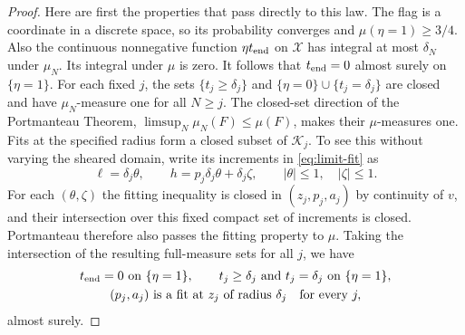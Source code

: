 \documentclass[11pt]{article}
\numberwithin{equation}{section}
\theoremstyle{definition}
\theoremstyle{remark}
\begin{document}
\begin{proof}
Here are first the properties that pass directly to this law.  The flag is
a coordinate in a discrete space, so its probability converges and
$\mu(\eta=1)\ge3/4$.  Also the continuous nonnegative function
$\eta t_{\rm end}$ on $\mathcal X$ has integral at most $\delta_N$ under
$\mu_N$.  Its integral under $\mu$ is zero.  It follows that
$t_{\rm end}=0$ almost surely on $\{\eta=1\}$.  For each fixed $j$, the sets
$\{t_j\ge\delta_j\}$ and $\{\eta=0\}\cup\{t_j=\delta_j\}$ are closed and
have $\mu_N$-measure one for all $N\ge j$.  The closed-set direction of the
Portmanteau Theorem, $\limsup_N\mu_N(F)\le\mu(F)$, makes their
$\mu$-measures one.  Fits at the specified radius form a closed subset of
$\mathcal K_j$.  To see this without varying the sheared domain, write its
increments in \eqref{eq:limit-fit} as
\[
  \ell=\delta_j\theta,\qquad
  h=p_j\delta_j\theta+\delta_j\zeta,
  \qquad |\theta|\le1,\quad |\zeta|\le1.
\]
For each $(\theta,\zeta)$ the fitting inequality is closed in
$(z_j,p_j,a_j)$ by continuity of $v$, and their intersection over this
fixed compact set of increments is closed.  Portmanteau therefore also
passes the fitting property to $\mu$.  Taking the intersection of the
resulting full-measure sets for all $j$, we have
\begin{equation}\label{eq:contact-mark-limit}
\begin{gathered}
  t_{\rm end}=0\text{ on }\{\eta=1\},\qquad
  t_j\ge\delta_j\text{ and }t_j=\delta_j\text{ on }\{\eta=1\},\\
  (p_j,a_j)\text{ is a fit at }z_j\text{ of radius }\delta_j
       \quad\text{for every }j,
\end{gathered}
\end{equation}
almost surely.


\end{proof}
\end{document}
